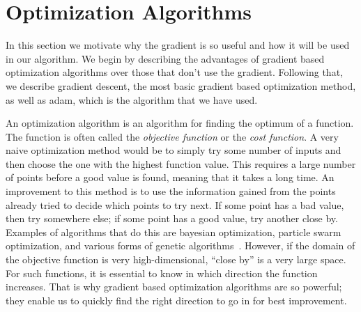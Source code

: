 \section{Optimization Algorithms}

In this section we motivate why the gradient is so useful and how it will be
used in our algorithm.
We begin by describing the advantages of gradient based optimization
algorithms over those that don't use the gradient.
Following that, we describe gradient descent, the most basic gradient based
optimization method, as well as \gls{adam}, which is the algorithm that we have
used.

An optimization algorithm is an algorithm for finding the optimum of a function.
The function is often called the \emph{objective function} or the \emph{cost
function}.
A very naive optimization method would be to simply try some number of inputs
and then choose the one with the highest function value.
This requires a large number of points before a good value is found,
meaning that it takes a long time.
An improvement to this method is to use the information gained from the points
already tried to decide which points to try next.
If some point has a bad value, then try somewhere else; if some point has a good
value, try another close by.
Examples of algorithms that do this are bayesian optimization, particle swarm
optimization, and various forms of genetic
algorithms~\cite{schneider2019benchmarking}.
However, if the domain of the objective function is very high-dimensional,
``close by'' is a very large space.
For such functions, it is essential to know in which direction the
function increases.
That is why gradient based optimization algorithms are so powerful;
they enable us to quickly find the right direction to go in for best
improvement.


